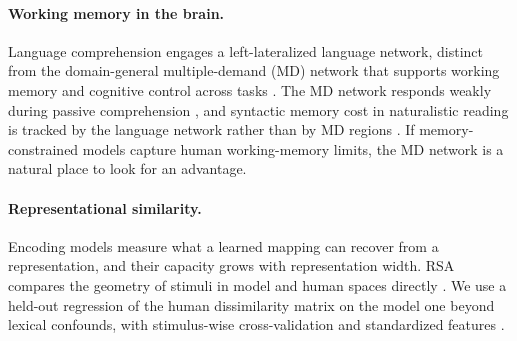 \paragraph{Working memory in the brain.}
Language comprehension engages a left-lateralized language network, distinct from the domain-general multiple-demand (MD) network that supports working memory and cognitive control across tasks \citep{duncan2010multiple,fedorenko2013broad}. The MD network responds weakly during passive comprehension \citep{diachek2020domain}, and syntactic memory cost in naturalistic reading is tracked by the language network rather than by MD regions \citep{shain2022robust}. If memory-constrained models capture human working-memory limits, the MD network is a natural place to look for an advantage.

\paragraph{Representational similarity.}
Encoding models measure what a learned mapping can recover from a representation, and their capacity grows with representation width. RSA compares the geometry of stimuli in model and human spaces directly \citep{kriegeskorte2008rsa}. We use a held-out regression of the human dissimilarity matrix on the model one beyond lexical confounds, with stimulus-wise cross-validation \citep{schutt2023statistical} and standardized features \citep{timkey2021allbark}.
